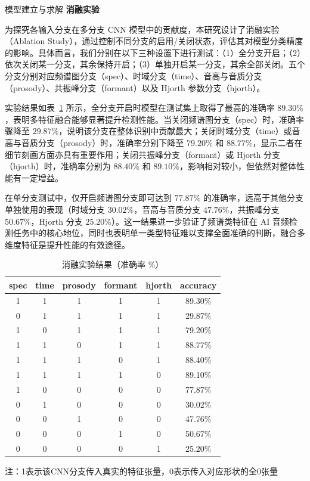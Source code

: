 \documentclass[aspectratio=169]{beamer}
\begin{document}
\begin{frame}{模型建立与求解}
\noindent\textbf{消融实验}\par

为探究各输入分支在多分支 CNN 模型中的贡献度，本研究设计了消融实验（Ablation Study），通过控制不同分支的启用/关闭状态，评估其对模型分类精度的影响。具体而言，我们分别在以下三种设置下进行测试：（1）全分支开启；（2）依次关闭某一分支，其余保持开启；（3）单独开启某一分支，其余全部关闭。五个分支分别对应频谱图分支（spec）、时域分支（time）、音高与音质分支（prosody）、共振峰分支（formant）以及 Hjorth 参数分支（hjorth）。

实验结果如表~\ref{tab:ablation} 所示，全分支开启时模型在测试集上取得了最高的准确率 $89.30\%$，表明多特征融合能够显著提升检测性能。当关闭频谱图分支（spec）时，准确率骤降至 $29.87\%$，说明该分支在整体识别中贡献最大；关闭时域分支（time）或音高与音质分支（prosody）时，准确率分别下降至 $79.20\%$ 和 $88.77\%$，显示二者在细节刻画方面亦具有重要作用；关闭共振峰分支（formant）或 Hjorth 分支（hjorth）时，准确率分别为 $88.40\%$ 和 $89.10\%$，影响相对较小，但依然对整体性能有一定增益。

在单分支测试中，仅开启频谱图分支即可达到 $77.87\%$ 的准确率，远高于其他分支单独使用的表现（时域分支 $30.02\%$，音高与音质分支 $47.76\%$，共振峰分支 $50.67\%$，Hjorth 分支 $25.20\%$）。这一结果进一步验证了频谱类特征在 AI 音频检测任务中的核心地位，同时也表明单一类型特征难以支撑全面准确的判断，融合多维度特征是提升性能的有效途径。

\begin{table}[htbp]
\centering
\begin{threeparttable}
\caption{消融实验结果（准确率 \%）}
\label{tab:ablation}
\begin{tabular}{cccccc}
\toprule
spec & time & prosody & formant & hjorth & accuracy \\
\midrule
1 & 1 & 1 & 1 & 1 & 89.30\% \\
0 & 1 & 1 & 1 & 1 & 29.87\% \\
1 & 0 & 1 & 1 & 1 & 79.20\% \\
1 & 1 & 0 & 1 & 1 & 88.77\% \\
1 & 1 & 1 & 0 & 1 & 88.40\% \\
1 & 1 & 1 & 1 & 0 & 89.10\% \\
1 & 0 & 0 & 0 & 0 & 77.87\% \\
0 & 1 & 0 & 0 & 0 & 30.02\% \\
0 & 0 & 1 & 0 & 0 & 47.76\% \\
0 & 0 & 0 & 1 & 0 & 50.67\% \\
0 & 0 & 0 & 0 & 1 & 25.20\% \\
\bottomrule
\end{tabular}
\begin{tablenotes}
\footnotesize
\item 注：1表示该CNN分支传入真实的特征张量，0表示传入对应形状的全0张量
\end{tablenotes}
\end{threeparttable}
\end{table}



\end{frame}
\end{document}
